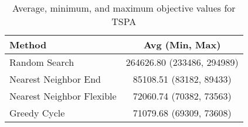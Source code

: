\begin{table}[h!]
\centering
\begin{tabular}{lc}
\hline
Method & Avg (Min, Max) \\
\hline
Random Search & 264626.80 (233486, 294989) \\
Nearest Neighbor End & 85108.51 (83182, 89433) \\
Nearest Neighbor Flexible & 72060.74 (70382, 73563) \\
Greedy Cycle & 71079.68 (69309, 73608) \\
\hline
\end{tabular}
\caption{Average, minimum, and maximum objective values for TSPA}
\label{tab:TSPA_results}
\end{table}
